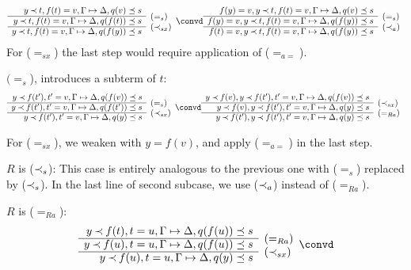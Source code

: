 \begin{PROOF}
\begin{LS}
\begin{LSA}
\[\begin{array}{rl}
y\Incl t, f(t)=v, \GSD, q(v)\preceq s \\ \cline{1-1}
y\Incl t, f(t)=v, \GSD, q(f(t))\preceq s & \rabove{(=_s)} \\ \cline{1-1}
y\Incl t, f(t)=v, \GSD, q(f(y))\preceq s & \rabove{(\Incl_{sx})} \end{array} \convd
 \begin{array}{rl}
f(y)=v, y\Incl t, f(t)=v, \GSD, q(v)\preceq s \\ \cline{1-1}
f(y)=v, y\Incl t, f(t)=v, \GSD, q(f(y))\preceq s & \rabove{(=_s)} \\ \cline{1-1}
f(t)=v, y\Incl t, f(t)=v, \GSD, q(f(y))\preceq s & \rabove{(\Incl_a)} \end{array} \]
%
For ($=_{sx}$) the last step would require application of ($=_{a=}$).
\item $(=_s$), introduces a subterm of $t$:
\[ \begin{array}{rl} 
y\Incl f(t'), t'=v, \GSD, q(f(v))\preceq s \\ \cline{1-1}
y\Incl f(t'), t'=v, \GSD, q(f(t'))\preceq s & \rabove{(=_s)} \\ \cline{1-1}
y\Incl f(t'), t'=v, \GSD, q(y)\preceq s & \rabove{(\Incl_{sx})} \end{array} \convd
 \begin{array}{rl}
y\Incl f(v), y\Incl f(t'), t'=v, \GSD, q(f(v))\preceq s \\ \cline{1-1}
y\Incl f(v), y\Incl f(t'), t'=v, \GSD, q(y)\preceq s & \rabove{(\Incl_{sx})} \\ \cline{1-1}
y\Incl f(t'), y\Incl f(t'), t'=v, \GSD, q(y)\preceq s & \rabove{(=_{Ra})} \end{array} \]
 \end{LSA}
%
For ($=_{sx}$), we weaken with $y=f(v)$, and apply ($=_{a=}$) in the last step.
\item $R$ is ($\mathbin{\prec}_s$):
This case is entirely analogous to the previous one with ($=_s$) replaced by
($\mathbin{\prec}_s$). In the last line of second subcase, we use ($\mathbin{\prec}_a$) instead
of ($=_{Ra}$).
\item $R$ is ($=_{Ra}$):
\[ \begin{array}{rl}
 y\Incl f(t), t=u, \GSD, q(f(u))\preceq s \\ \cline{1-1}
 y\Incl f(u), t=u, \GSD, q(f(u))\preceq s & \rabove{(=_{Ra})} \\ \cline{1-1}
 y\Incl f(u), t=u, \GSD, q(y)\preceq s & \rabove{(\Incl_{sx})} \end{array} \convd
\]
\end{LS}
\end{PROOF}
